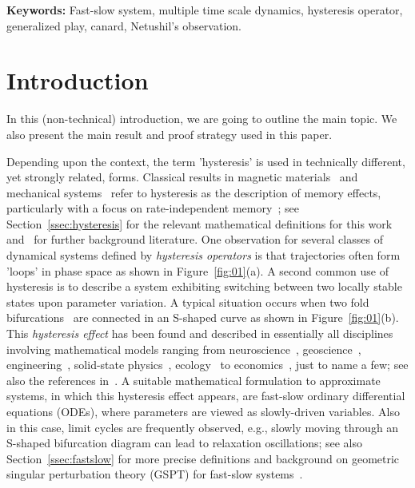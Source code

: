 \documentclass[12pt]{article}
\begin{document}
\textbf{Keywords:} Fast-slow system, multiple time scale dynamics, hysteresis operator,
generalized play, canard, Netushil's observation.

\section{Introduction}
\label{sec:intro}

In this (non-technical) introduction, we are going to outline the main topic. 
We also present the main result and proof strategy used in this paper.\medskip 

Depending upon the context, the term 'hysteresis' is used in technically 
different, yet strongly related, forms. Classical results in magnetic 
materials~\cite{StonerWohlfarth,DellaTorre} and mechanical 
systems~\cite{Love,MuellerXu} refer to hysteresis as the description of memory effects, 
particularly with a focus on rate-independent memory~\cite{MielkeTheil}; see 
Section~\ref{ssec:hysteresis} for the relevant mathematical definitions for this work
and~\cite{Mayergoyz,BrokateSprekels,KrasnoselskiiPokrovskii,Visintin,MielkeRoubicek} for 
further background literature. One observation for several classes of dynamical 
systems defined by \emph{hysteresis operators} is that trajectories often form 
'loops' in phase space as shown in Figure~\ref{fig:01}(a). A second common use of 
hysteresis is to describe a system exhibiting switching between two locally stable 
states upon parameter variation. A typical situation occurs when two fold 
bifurcations~\cite{GH} are connected in an S-shaped curve as shown in 
Figure~\ref{fig:01}(b). This \emph{hysteresis effect} has been found and described 
in essentially all disciplines involving mathematical models ranging from 
neuroscience~\cite{FitzHugh}, geoscience~\cite{GanopolskiRahmstorf}, 
engineering~\cite{vanderPol1}, solid-state physics~\cite{Strogatz}, 
ecology~\cite{BeisnerHaydonCuddington} to economics~\cite{Cross}, 
just to name a few; see also the references in~\cite{KuehnBook}. A suitable 
mathematical formulation to approximate systems, in which this hysteresis effect appears, 
are fast-slow ordinary differential equations (ODEs), where parameters are viewed as 
slowly-driven variables. Also in this case, limit cycles are frequently 
observed, e.g., slowly moving through an S-shaped bifurcation diagram 
can lead to relaxation oscillations; see also Section~\ref{ssec:fastslow} 
for more precise definitions and background on geometric singular 
perturbation theory (GSPT) for fast-slow systems~\cite{KuehnBook}.\medskip 
\end{document}
